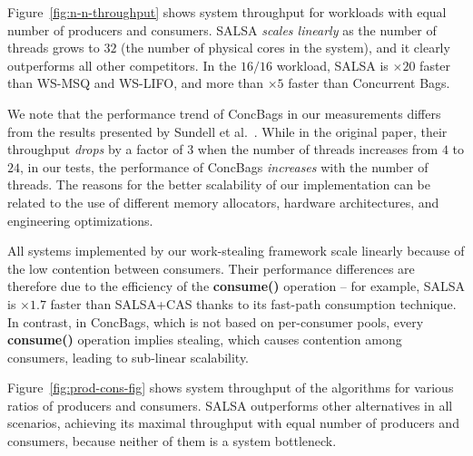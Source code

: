 Figure~\ref{fig:n-n-throughput} shows system throughput for workloads with equal number of producers and consumers. SALSA \emph{scales linearly} as the number of threads grows to $32$ (the number of physical cores in the system), and it clearly outperforms all other competitors. In the $16/16$ workload, SALSA is $\times20$ faster than WS-MSQ and WS-LIFO, and more than $\times5$ faster than Concurrent Bags. 

We note that the performance trend of ConcBags in our measurements differs from the results presented by Sundell et al.~\cite{Sundell:2011:LAC:1989493.1989550}. 
While in the original paper, their throughput \emph{drops} by a factor of $3$ when the number of threads increases from $4$ to $24$, in our tests, the performance of ConcBags \emph{increases} with the number of threads. The reasons for the better scalability of our implementation can be related to the use of different memory allocators, hardware architectures, and engineering optimizations. %

All systems implemented by our work-stealing framework scale linearly because of the low contention between consumers. 
Their performance differences are therefore due to the efficiency of the {\bf consume()} operation -- for example, SALSA is $\times1.7$ faster than SALSA+CAS thanks to its fast-path consumption technique.
In contrast, in ConcBags, which is not based on per-consumer pools, every {\bf consume()} operation implies stealing, which causes contention among consumers, leading to sub-linear scalability.

Figure~\ref{fig:prod-cons-fig} shows system throughput of the algorithms for various ratios of producers and consumers. 
SALSA outperforms other alternatives in all scenarios, achieving its maximal throughput with equal number of producers and consumers, because neither of them is a system bottleneck. 

%


